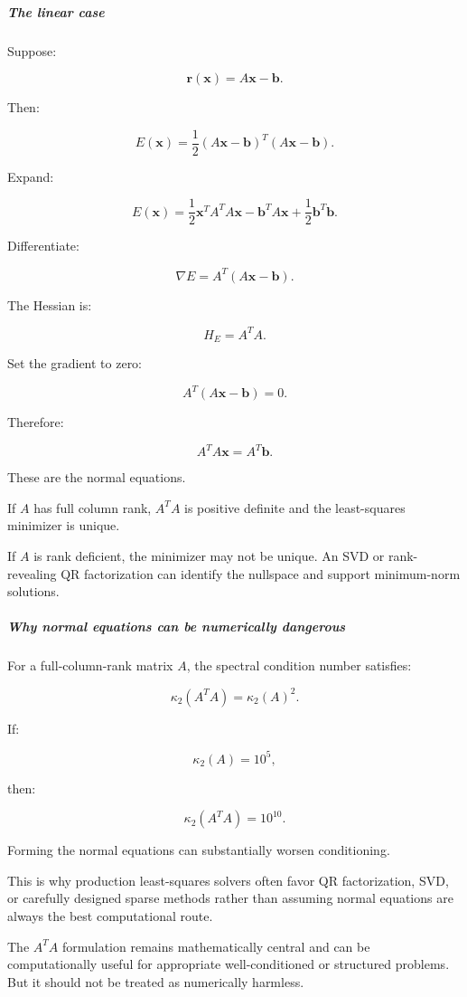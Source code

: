 \subparagraph{The linear case}\label{the-linear-case}

Suppose:

\[
\mathbf r(\mathbf x)=A\mathbf x-\mathbf b.
\]

Then:

\[
E(\mathbf x)= \frac12(A\mathbf x-\mathbf b)^T(A\mathbf x-\mathbf b).
\]

Expand:

\[
E(\mathbf x) = \frac12\mathbf x^TA^TA\mathbf x -\mathbf b^TA\mathbf x +\frac12\mathbf b^T\mathbf b.
\]

Differentiate:

\[
\boxed{ \nabla E=A^T(A\mathbf x-\mathbf b) }.
\]

The Hessian is:

\[
\boxed{H_E=A^TA}.
\]

Set the gradient to zero:

\[
A^T(A\mathbf x-\mathbf b)=0.
\]

Therefore:

\[
\boxed{A^TA\mathbf x=A^T\mathbf b}.
\]

These are the normal equations.

If \(A\) has full column rank, \(A^TA\) is positive definite and the least-squares minimizer is unique.

If \(A\) is rank deficient, the minimizer may not be unique. An SVD or rank-revealing QR factorization can identify the nullspace and support minimum-norm solutions.

\subparagraph{Why normal equations can be numerically dangerous}\label{why-normal-equations-can-be-numerically-dangerous}

For a full-column-rank matrix \(A\), the spectral condition number satisfies:

\[
\boxed{ \kappa_2(A^TA)=\kappa_2(A)^2 }.
\]

If:

\[
\kappa_2(A)=10^5,
\]

then:

\[
\kappa_2(A^TA)=10^{10}.
\]

Forming the normal equations can substantially worsen conditioning.

This is why production least-squares solvers often favor QR factorization, SVD, or carefully designed sparse methods rather than assuming normal equations are always the best computational route.

The \(A^TA\) formulation remains mathematically central and can be computationally useful for appropriate well-conditioned or structured problems. But it should not be treated as numerically harmless.

